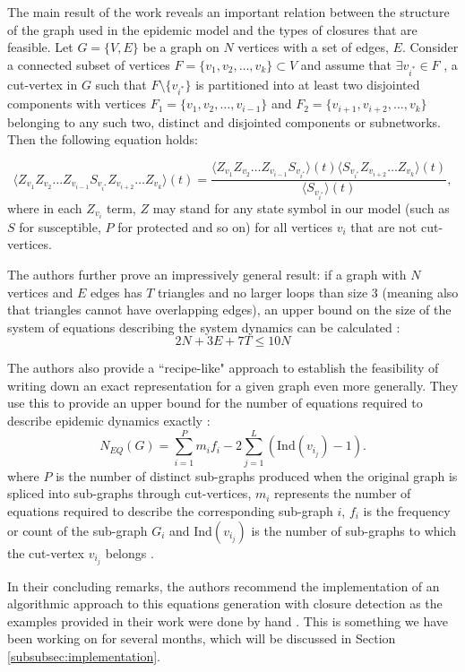 \documentclass[../report.tex]{subfiles}
\begin{document}
The main result of the work reveals an important relation between the structure of the graph used in the epidemic model and the types of closures that are feasible. Let $G = \{V, E\}$ be a graph on $N$ vertices with a set of edges, $E$. Consider a connected subset of vertices $F = \{v_1, v_2, \dots, v_k\} \subset V$ and assume that $\exists v_{i^*} \in F$ , a cut-vertex in $G$ such that $F \setminus \{ v_{i^*} \}$ is partitioned into at least two disjointed components with vertices $F_1 = \{ v_1, v_2, \dots, v_{i-1} \}$ and $F_2 = \{ v_{i+1}, v_{i+2}, \dots, v_k \}$ belonging to any such two, distinct and disjointed components or subnetworks. Then the following equation holds:

$$
\langle Z_{v_1} Z_{v_2} \dots Z_{v_{i-1}} S_{v_{i^*}} Z_{v_{i+2}} \dots Z_{v_k} \rangle (t) = \frac{\langle Z_{v_1} Z_{v_2} \dots Z_{v_{i-1}} S_{v_{i^*}} \rangle (t) \langle S_{v_{i^*}} Z_{v_{i+2}} \dots Z_{v_k} \rangle (t)}{\langle S_{v_{i^*}} \rangle (t)},
$$
where in each $Z_{v_i}$ term, $Z$ may stand for any state symbol in our model (such as $S$ for susceptible, $P$ for protected and so on) for all vertices $v_i$ that are not cut-vertices.

The authors further prove an impressively general result: if a graph with $N$ vertices and  $E$ edges has $T$ triangles and no larger loops than size 3 (meaning also that triangles cannot have overlapping edges), an upper bound on the size of the system of equations describing the system dynamics can be calculated \cite{kiss_2014}:
$$
2N + 3E + 7T \leq 10N
$$

The authors also provide a ``recipe-like" approach to establish the feasibility of writing down an exact representation for a given graph even more generally. They use this to provide an upper bound for the number of equations required to describe epidemic dynamics exactly \cite{kiss_2014}:
$$
\displaystyle N_{EQ}(G)=\sum^P_{i=1}m_if_i - 2\sum^{L}_{j=1}(\text{Ind}(v_{i_j})-1).
$$
where $P$ is the number of distinct sub-graphs produced when the original graph is spliced into sub-graphs through cut-vertices, $m_i$ represents the number of equations required to describe the corresponding sub-graph $i$, $f_i$ is the frequency or count of the sub-graph $G_i$ and $\text{Ind}(v_{i_j})$ is the number of sub-graphs to which the cut-vertex $v_{i_j}$ belongs \cite{kiss_2014}.

In their concluding remarks, the authors recommend the implementation of an algorithmic approach to this equations generation with closure detection as the examples provided in their work were done by hand \cite{kiss_2014}. This is something we have been working on for several months, which will be discussed in Section \ref{subsubsec:implementation}. 
\end{document}
